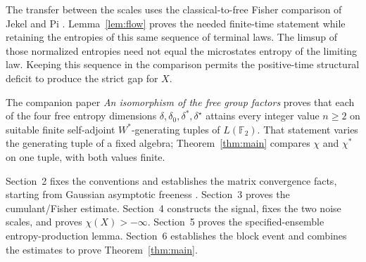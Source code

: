 The transfer between the scales uses the classical-to-free Fisher
comparison of Jekel and Pi \cite[Proposition~6.1]{JP}.
Lemma~\ref{lem:flow} proves the needed finite-time statement while retaining
the entropies of this same sequence of terminal laws. The limsup of those
normalized entropies need not equal the microstates entropy of the limiting
law. Keeping this sequence in the comparison permits the positive-time
structural deficit to produce the strict gap for $X$.

The companion paper \emph{An isomorphism of the free group factors}
\cite[Corollary~7.1]{FreeGroupFactors} proves that each of the four free
entropy dimensions $\delta,\delta_0,\delta^*,\delta^\star$ attains every
integer value $n\geq2$ on suitable finite self-adjoint $W^*$-generating
tuples of $L(\mathbb F_2)$. That statement varies the generating tuple of
a fixed algebra; Theorem~\ref{thm:main} compares $\chi$ and $\chi^*$ on one
tuple, with both values finite.

Section~2 fixes the conventions and establishes the matrix convergence
facts, starting from Gaussian asymptotic freeness \cite{Vgue,NS}.
Section~3 proves the cumulant/Fisher estimate. Section~4 constructs the
signal, fixes the two noise scales, and proves $\chi(X)>-\infty$.
Section~5 proves the specified-ensemble entropy-production
lemma. Section~6 establishes the block event and combines the estimates
to prove Theorem~\ref{thm:main}.
